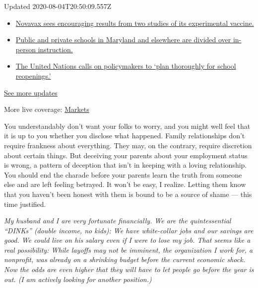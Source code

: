 Updated 2020-08-04T20:50:09.557Z

\begin{itemize}
\tightlist
\item
  \href{https://www.nytimes3xbfgragh.onion/2020/08/04/world/coronavirus-cases.html?action=click\&pgtype=Article\&state=default\&region=MAIN_CONTENT_1\&context=storylines_live_updates\#link-1228a480}{Novavax
  sees encouraging results from two studies of its experimental
  vaccine.}
\item
  \href{https://www.nytimes3xbfgragh.onion/2020/08/04/world/coronavirus-cases.html?action=click\&pgtype=Article\&state=default\&region=MAIN_CONTENT_1\&context=storylines_live_updates\#link-4825b93}{Public
  and private schools in Maryland and elsewhere are divided over
  in-person instruction.}
\item
  \href{https://www.nytimes3xbfgragh.onion/2020/08/04/world/coronavirus-cases.html?action=click\&pgtype=Article\&state=default\&region=MAIN_CONTENT_1\&context=storylines_live_updates\#link-50f7386d}{The
  United Nations calls on policymakers to `plan thoroughly for school
  reopenings.'}
\end{itemize}

\href{https://www.nytimes3xbfgragh.onion/2020/08/04/world/coronavirus-cases.html?action=click\&pgtype=Article\&state=default\&region=MAIN_CONTENT_1\&context=storylines_live_updates}{See
more updates}

More live coverage:
\href{https://www.nytimes3xbfgragh.onion/live/2020/08/04/business/stock-market-today-coronavirus?action=click\&pgtype=Article\&state=default\&region=MAIN_CONTENT_1\&context=storylines_live_updates}{Markets}

You understandably don't want your folks to worry, and you might well
feel that it is up to you whether you disclose what happened. Family
relationships don't require frankness about everything. They may, on the
contrary, require discretion about certain things. But deceiving your
parents about your employment status is wrong, a pattern of deception
that isn't in keeping with a loving relationship. You should end the
charade before your parents learn the truth from someone else and are
left feeling betrayed. It won't be easy, I realize. Letting them know
that you haven't been honest with them is bound to be a source of shame
--- this time justified.

\emph{My husband and I are very fortunate financially. We are the
quintessential ``DINKs'' (double income, no kids): We have white-collar
jobs and our savings are good. We could live on his salary even if I
were to lose my job. That seems like a real possibility: While layoffs
may not be imminent, the organization I work for, a nonprofit, was
already on a shrinking budget before the current economic shock. Now the
odds are even higher that they will have to let people go before the
year is out. (I am actively looking for another position.)}

